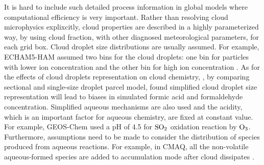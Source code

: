 \documentclass[edeposit,fullpage]{uiucthesis2009}
\begin{document}
It is hard to include such detailed process information in global
models where computational efficiency is very important. Rather than
resolving cloud microphysics explixcitly, cloud properties are
described in a highly parameterized way, by using cloud fraction, with
other diagnosed meteorological parameters, for each grid box. Cloud
droplet size distributions are usually assumed. For example,
ECHAM5-HAM assumed two bins for the cloud droplets: one bin for
particles with lower ion concentration and the other bin for high ion
concentration \citep{roelofs2006aerosol}. As for the effects of cloud droplets representation on
cloud chemistry, \citet{barth2006importance}, by comparing sectional
and single-size droplet parcel model, found simplified cloud droplet
size representation will lead to biases in simulated formic acid and
formaldehyde concentration. Simplified aqueous mechanisms are also
used and the acidity, which is an important factor for aqueous
chemistry, are fixed at constant value. For example, GEOS-Chem used a
pH of 4.5 for $\rm SO_2$ oxidation reaction by $\rm
O_3$\citep{park2004natural}. Furthermore, assumptions need to be made
to consider the distribution of species produced from aqueous
reactions. For example, in CMAQ, all the non-volatile aqueous-formed
species are added to accumulation mode after cloud dissipates
\citep{binkowski2003models, fahey2017framework}.
 
\end{document}

